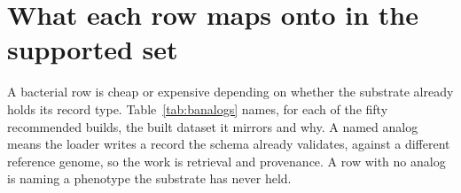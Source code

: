 
\section{What each row maps onto in the supported set}\label{sec:analogs}

A bacterial row is cheap or expensive depending on whether the substrate already holds its
record type. Table~\ref{tab:banalogs} names, for each of the fifty recommended builds, the
built  dataset it mirrors and why. A named analog means the loader
writes a record the schema already validates, against a different reference genome, so the
work is retrieval and provenance. A row with no analog is naming a phenotype the substrate has never held.


